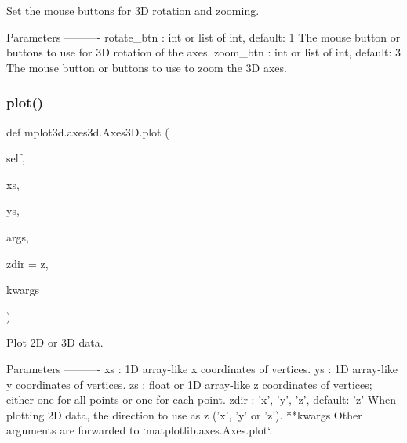 \begin{DoxyVerb}
\begin{DoxyVerb}Set the mouse buttons for 3D rotation and zooming.

Parameters
----------
rotate_btn : int or list of int, default: 1
    The mouse button or buttons to use for 3D rotation of the axes.
zoom_btn : int or list of int, default: 3
    The mouse button or buttons to use to zoom the 3D axes.
\end{DoxyVerb}
 \mbox{\label{classmplot3d_1_1axes3d_1_1Axes3D_ad222e8f23a743b1088f1650b9623f0fa}} 
\subsubsection{\texorpdfstring{plot()}{plot()}}
{\footnotesize\ttfamily def mplot3d.\+axes3d.\+Axes3\+D.\+plot (\begin{DoxyParamCaption}\item[{}]{self,  }\item[{}]{xs,  }\item[{}]{ys,  }\item[{}]{args,  }\item[{}]{zdir = {\ttfamily \textquotesingle{}z\textquotesingle{}},  }\item[{}]{kwargs }\end{DoxyParamCaption})}

\begin{DoxyVerb}Plot 2D or 3D data.

Parameters
----------
xs : 1D array-like
    x coordinates of vertices.
ys : 1D array-like
    y coordinates of vertices.
zs : float or 1D array-like
    z coordinates of vertices; either one for all points or one for
    each point.
zdir : {'x', 'y', 'z'}, default: 'z'
    When plotting 2D data, the direction to use as z ('x', 'y' or 'z').
**kwargs
    Other arguments are forwarded to `matplotlib.axes.Axes.plot`.
\end{DoxyVerb}
 \mbox{\label{classmplot3d_1_1axes3d_1_1Axes3D_af856a122bcabcfb808d722945f63b92e}} 

\end{DoxyVerb}
